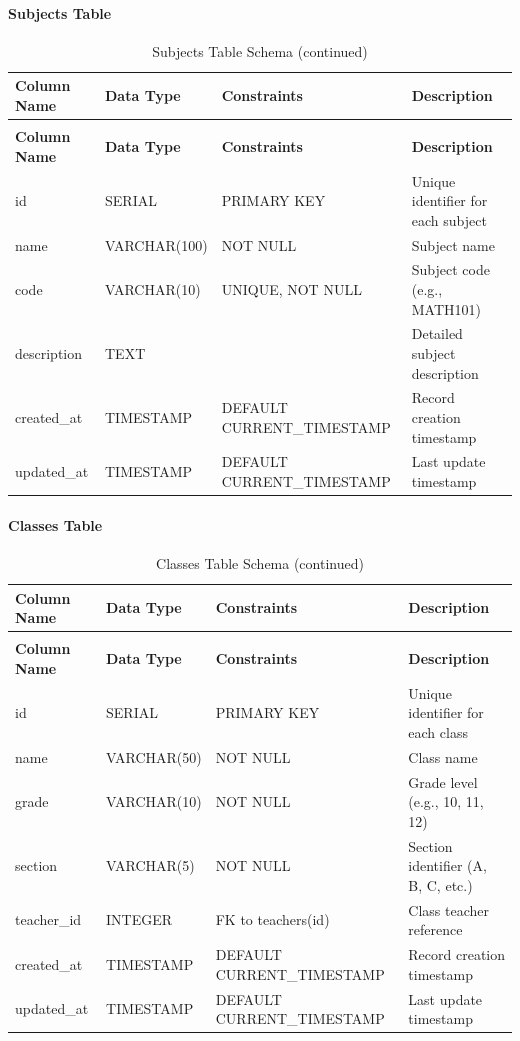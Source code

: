 \documentclass[12pt,a4paper]{report}
\begin{document}
\paragraph{Subjects Table}
\begin{longtable}{|p{3cm}|p{3cm}|p{2cm}|p{6cm}|}
\caption{Subjects Table Schema}
\label{tab:subjects}\\
\hline
\textbf{Column Name} & \textbf{Data Type} & \textbf{Constraints} & \textbf{Description} \\
\hline
\endfirsthead
\caption[]{Subjects Table Schema (continued)}\\
\hline
\textbf{Column Name} & \textbf{Data Type} & \textbf{Constraints} & \textbf{Description} \\
\hline
\endhead
id & SERIAL & PRIMARY KEY & Unique identifier for each subject \\
\hline
name & VARCHAR(100) & NOT NULL & Subject name \\
\hline
code & VARCHAR(10) & UNIQUE, NOT NULL & Subject code (e.g., MATH101) \\
\hline
description & TEXT & & Detailed subject description \\
\hline
created\_at & TIMESTAMP & DEFAULT CURRENT\_TIMESTAMP & Record creation timestamp \\
\hline
updated\_at & TIMESTAMP & DEFAULT CURRENT\_TIMESTAMP & Last update timestamp \\
\hline
\end{longtable}

\paragraph{Classes Table}
\begin{longtable}{|p{3cm}|p{3cm}|p{2cm}|p{6cm}|}
\caption{Classes Table Schema}
\label{tab:classes}\\
\hline
\textbf{Column Name} & \textbf{Data Type} & \textbf{Constraints} & \textbf{Description} \\
\hline
\endfirsthead
\caption[]{Classes Table Schema (continued)}\\
\hline
\textbf{Column Name} & \textbf{Data Type} & \textbf{Constraints} & \textbf{Description} \\
\hline
\endhead
id & SERIAL & PRIMARY KEY & Unique identifier for each class \\
\hline
name & VARCHAR(50) & NOT NULL & Class name \\
\hline
grade & VARCHAR(10) & NOT NULL & Grade level (e.g., 10, 11, 12) \\
\hline
section & VARCHAR(5) & NOT NULL & Section identifier (A, B, C, etc.) \\
\hline
teacher\_id & INTEGER & FK to teachers(id) & Class teacher reference \\
\hline
created\_at & TIMESTAMP & DEFAULT CURRENT\_TIMESTAMP & Record creation timestamp \\
\hline
updated\_at & TIMESTAMP & DEFAULT CURRENT\_TIMESTAMP & Last update timestamp \\
\hline
\end{longtable}
\end{document}
